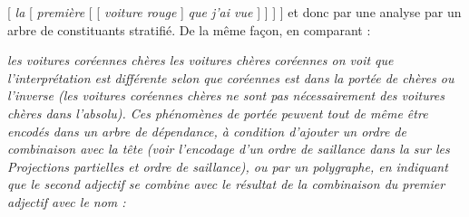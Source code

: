 {    \ea{}
    [ \textit{la} [ \textit{première} [ [ \textit{voiture rouge} ] \textit{que j’ai vue} ] ] ] ]
    \z
    et donc par une analyse par un arbre de constituants stratifié. De la même façon, en comparant :

    \ea
    \ea \itshape les voitures coréennes chères
    \ex \itshape les voitures chères coréennes
    \z
    \z
    on voit que l’interprétation est différente selon que \textit{coréennes} est dans la portée de \textit{chères} ou l’inverse (les voitures coréennes chères ne sont pas nécessairement des voitures chères dans l'absolu). Ces phénomènes de portée peuvent tout de même être encodés dans un arbre de dépendance, à condition d’ajouter un ordre de combinaison avec la tête (voir l'encodage d'un ordre de saillance dans la  sur les \textit{Projections partielles et ordre de saillance}), ou par un polygraphe, en indiquant que le second adjectif se combine avec le résultat de la combinaison du premier adjectif avec le nom :
    
}
